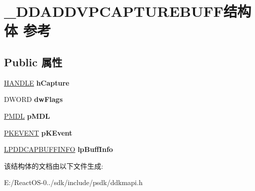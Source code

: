\hypertarget{struct___d_d_a_d_d_v_p_c_a_p_t_u_r_e_b_u_f_f}{}\section{\+\_\+\+D\+D\+A\+D\+D\+V\+P\+C\+A\+P\+T\+U\+R\+E\+B\+U\+F\+F结构体 参考}
\label{struct___d_d_a_d_d_v_p_c_a_p_t_u_r_e_b_u_f_f}
\subsection*{Public 属性}
\begin{DoxyCompactItemize}
\item 
\mbox{\label{struct___d_d_a_d_d_v_p_c_a_p_t_u_r_e_b_u_f_f_affdaad0a6849b47b7c6cac47442266dc}} 
\hyperlink{interfacevoid}{H\+A\+N\+D\+LE} {\bfseries h\+Capture}
\item 
\mbox{\label{struct___d_d_a_d_d_v_p_c_a_p_t_u_r_e_b_u_f_f_aadf1bc79e333af778decdfedeec0adca}} 
D\+W\+O\+RD {\bfseries dw\+Flags}
\item 
\mbox{\label{struct___d_d_a_d_d_v_p_c_a_p_t_u_r_e_b_u_f_f_a773dbc0ccb620a69471ad87b261273e9}} 
\hyperlink{interfacevoid}{P\+M\+DL} {\bfseries p\+M\+DL}
\item 
\mbox{\label{struct___d_d_a_d_d_v_p_c_a_p_t_u_r_e_b_u_f_f_abd7f94abf80dcebaaf940d4efdbfaa57}} 
\hyperlink{struct___k_e_v_e_n_t}{P\+K\+E\+V\+E\+NT} {\bfseries p\+K\+Event}
\item 
\mbox{\label{struct___d_d_a_d_d_v_p_c_a_p_t_u_r_e_b_u_f_f_abff083e526df7d5d2bd2336a00ca716d}} 
\hyperlink{struct___d_d_c_a_p_b_u_f_f_i_n_f_o}{L\+P\+D\+D\+C\+A\+P\+B\+U\+F\+F\+I\+N\+FO} {\bfseries lp\+Buff\+Info}
\end{DoxyCompactItemize}


该结构体的文档由以下文件生成\+:\begin{DoxyCompactItemize}
\item 
E\+:/\+React\+O\+S-\/0../sdk/include/psdk/ddkmapi.\+h\end{DoxyCompactItemize}
